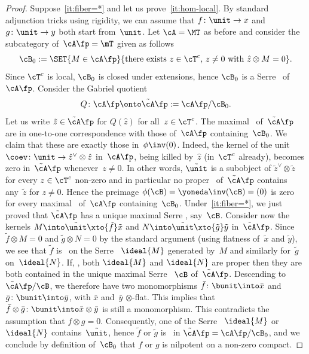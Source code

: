 \begin{appendix}
\begin{proof}
Suppose~\eqref{it:fiber=*} and let us prove~\eqref{it:hom-local}. By standard adjunction tricks using rigidity, we can assume that $f\colon \unit\to x$ and $g\colon \unit\to y$ both start from~$\unit$. Let $\cA=\MT$ as before and consider the subcategory of~$\cA\fp=\mT$ given as follows
\[
\cB_0:=\SET{M\in\cA\fp}{\text{there exists }z\in\cT^c,\,z\neq 0\text{ with }\hat z\otimes M=0}.
\]
Since $\cT^c$ is local, $\cB_0$ is closed under extensions, hence $\cB_0$ is a Serre \tensid\ of~$\cA\fp$. Consider the Gabriel quotient
\[
Q\colon \cA\fp\onto \tilde\cA\fp:=\cA\fp/\cB_0.
\]
Let us write $\tilde z\in\tilde\cA\fp$ for $Q(\hat z)$ for all~$z\in\cT^c$. The maximal \tensids\ of~$\tilde\cA\fp$ are in one-to-one correspondence with those of~$\cA\fp$ containing~$\cB_0$. We claim that these are exactly those in~$\phi\inv(0)$. Indeed, the kernel of the unit $\coev\colon \unit\to \hat z^\vee\otimes \hat z$ in~$\cA\fp$, being killed by~$\hat z$ (in~$\cT^c$ already), becomes zero in~$\tilde\cA\fp$ whenever~$z\neq 0$. In other words, $\tilde\unit$ is a subobject of $\tilde z^\vee\otimes\tilde z$ for every $z\in\cT^c$ non-zero and in particular no proper \tensid\ of~$\tilde\cA\fp$ contains any~$\tilde z$ for $z\neq 0$. Hence the preimage $\phi(\cB)=\yoneda\inv(\cB)=(0)$ is zero for every maximal \tensid\ of~$\cA\fp$ containing~$\cB_0$. Under~\eqref{it:fiber=*}, we just proved that $\tilde\cA\fp$ has a unique maximal Serre \tensid, say~$\cB$. Consider now the kernels $M\into \tilde\unit\xto{\tilde f}\tilde x$ and $N\into \tilde\unit\xto{\tilde g}\tilde y$ in~$\tilde\cA\fp$. Since $\tilde f\otimes M=0$ and $\tilde g\otimes N=0$ by the standard argument (using flatness of~$\tilde x$ and $\tilde y$), we see that $\tilde f$ is \tensnil\ on the Serre \tensid\ $\ideal{M}$ generated by~$M$ and similarly for~$\tilde g$ on~$\ideal{N}$. If, \ababs, both $\ideal{M}$ and $\ideal{N}$ are proper then they are both contained in the unique maximal Serre \tensid~$\cB$ of~$\tilde\cA\fp$. Descending to~$\tilde\cA\fp/\cB$, we therefore have two monomorphisms $\bar f\colon \bunit\into \bar x$ and~$\bar g\colon \bunit\into \bar y$, with $\bar x$ and~$\bar y$ $\otimes$-flat. This implies that $\bar f\otimes \bar g\colon \bunit\into \bar x\otimes\bar y$ is still a monomorphism. This contradicts the assumption that $f\otimes g=0$. Consequently, one of the Serre \tensids~$\ideal{M}$ or~$\ideal{N}$ contains~$\tilde\unit$, hence $\tilde f$ or $\tilde g$ is \tensnil\ in $\tilde\cA\fp=\cA\fp/\cB_0$, and we conclude by definition of~$\cB_0$ that $f$ or $g$ is nilpotent on a non-zero compact.


\end{proof}
\end{appendix}
